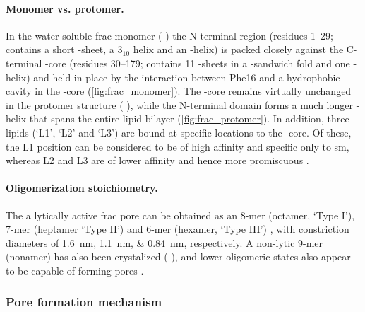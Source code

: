 \paragraph{Monomer vs. protomer.}
%
In the water-soluble \gls{frac} monomer ( \cite{Tanaka-2015}) the N-terminal region (residues
1--29; contains a short \tb-sheet, a 3$_10$ helix and an \ta-helix) is packed closely against the C-terminal
\tb-core (residues 30--179; contains 11 \tb-sheets in a \tb-sandwich fold and one \ta-helix) and held in place
by the interaction between Phe16 and a hydrophobic cavity in the \tb-core (\cref{fig:frac_monomer}). The
\tb-core remains virtually unchanged in the protomer structure ( \cite{Tanaka-2015}), while the
N-terminal domain forms a much longer \ta-helix that spans the entire lipid bilayer
(\cref{fig:frac_protomer}). In addition, three lipids (`L1', `L2' and `L3') are bound at specific locations to
the \tb-core. Of these, the L1 position can be considered to be of high affinity and specific only to
\gls{sm}, whereas L2 and L3 are of lower affinity and hence more promiscuous \cite{Tanaka-2015}. 

\paragraph{Oligomerization stoichiometry.}
%
The a lytically active \gls{frac} pore can be obtained as an 8-mer (octamer, `Type I'), 7-mer (heptamer `Type
II') and 6-mer (hexamer, `Type III') \cite{Huang-2019}, with constriction diameters of
\SIlist{1.6;1.1;0.84}{\nm}, respectively. A non-lytic 9-mer (nonamer) has also been crystalized (
\cite{Mechaly-2011}), and lower oligomeric states also appear to be capable of forming pores
\cite{Rojko-2016}.

\subsubsection{Pore formation mechanism}

